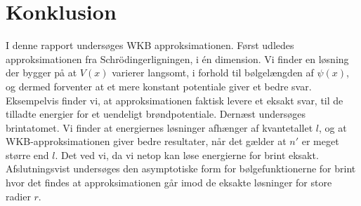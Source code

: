 \section{Konklusion}
I denne rapport undersøges WKB approksimationen. Først udledes approksimationen fra Schrödingerligningen, i én dimension. Vi finder en løsning der bygger på at $V(x)$ varierer langsomt, i forhold til bølgelængden af $\psi(x)$, og dermed forventer at et mere konstant potentiale giver et bedre svar. Eksempelvis finder vi, at approksimationen faktisk levere et eksakt svar, til de tilladte energier for et uendeligt brøndpotentiale. Dernæst undersøges brintatomet. Vi finder at energiernes løsninger afhænger af kvantetallet $l$, og at WKB-approksimationen giver bedre resultater, når det gælder at $n'$ er meget større end $l$. Det ved vi, da vi netop kan løse energierne for brint eksakt. Afslutningsvist undersøges den asymptotiske form for bølgefunktionerne for brint hvor det findes at approksimationen går imod de eksakte løsninger for store radier $r$.
